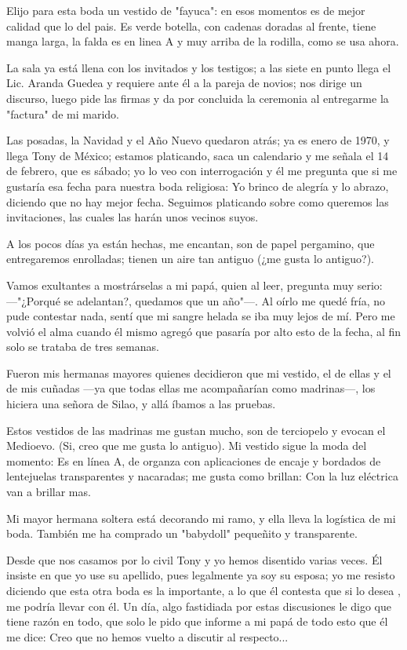 \documentclass[letterpaper, 12pt]{book}
\begin{document}
Elijo para esta boda un vestido de "fayuca": en esos momentos es de mejor calidad que lo del pais. Es verde botella, con cadenas doradas al frente, tiene manga larga, la falda es en linea A y muy arriba de la rodilla, como se usa ahora.

La sala ya está llena con los invitados y los testigos; a las siete en punto llega el Lic. Aranda Guedea y requiere ante él a la pareja de novios; nos dirige un discurso, luego pide las firmas y da por concluida la ceremonia al entregarme la "factura" de mi marido.

Las posadas, la Navidad y el Año Nuevo quedaron atrás; ya es enero de 1970, y llega Tony de México; estamos platicando, saca un calendario y me señala el 14 de febrero, que es sábado; yo lo veo con interrogación y él me pregunta que si me gustaría esa fecha para nuestra boda religiosa: Yo brinco de alegría y lo abrazo, diciendo que no hay mejor fecha. Seguimos platicando sobre como queremos las invitaciones, las cuales las harán unos vecinos suyos.

A los pocos días ya están hechas, me encantan, son de papel pergamino, que entregaremos enrolladas; tienen un aire tan antiguo (¿me gusta lo antiguo?).

Vamos exultantes a mostrárselas a mi papá, quien al leer, pregunta muy serio: ---"¿Porqué se adelantan?, quedamos que un año"---. Al oírlo me quedé fría, no pude contestar nada, sentí que mi sangre helada se iba muy lejos de mí. Pero me volvió el alma cuando él mismo agregó que pasaría por alto esto de la fecha, al fin solo se trataba de tres semanas.

Fueron mis hermanas mayores quienes decidieron que mi vestido, el de ellas y el de mis cuñadas ---ya que todas ellas me acompañarían como madrinas---, los hiciera una señora de Silao, y allá íbamos a las pruebas.

Estos vestidos de las madrinas me gustan mucho, son de terciopelo y evocan el Medioevo. (Si, creo que me gusta lo antiguo).  
Mi vestido sigue la moda del momento: Es en línea A, de organza con aplicaciones de encaje y bordados de lentejuelas transparentes y nacaradas; me gusta como brillan: Con la luz eléctrica van a brillar mas.

Mi mayor hermana soltera está decorando mi ramo, y ella lleva la logística de mi boda. También me ha comprado un "babydoll" pequeñito y transparente.

Desde que nos casamos por lo civil Tony y yo hemos disentido varias veces. Él insiste en que yo use su apellido, pues legalmente ya soy su esposa; yo me resisto diciendo que esta otra boda es la importante, a lo que él contesta que si lo desea , me podría llevar con él. Un día, algo fastidiada por estas discusiones le digo que tiene razón en todo, que solo le pido que informe a mi papá de todo esto que él me dice: Creo que no hemos vuelto a discutir al respecto...
\end{document}
